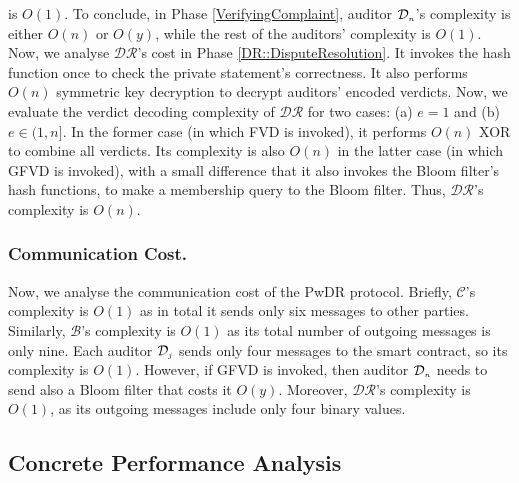 is $O(1)$. To conclude, in Phase \ref{VerifyingComplaint},  auditor $\mathcal{D}_{\scriptscriptstyle n}$'s complexity is either $O(n)$ or $O(y)$, while the rest of  the auditors' complexity is $O(1)$. Now, we analyse $\mathcal{DR}$'s cost in Phase \ref{DR::DisputeResolution}. It invokes the hash function once to check the private statement's correctness. It also performs $O(n)$ symmetric key decryption to decrypt auditors' encoded verdicts. Now, we evaluate the verdict decoding complexity of $\mathcal{DR}$ 
for two cases: (a) $e = 1$ and (b) $e \in (1, n]$. In the former case (in which  FVD is invoked), it performs $O(n)$ XOR to combine all verdicts. Its complexity is also $O(n)$ in the latter case (in which  GFVD is invoked), with a small difference that it also invokes the Bloom filter's hash functions, to make a membership query to the Bloom filter.  Thus, $\mathcal{DR}$'s complexity is $O(n)$. 

\vspace{-4mm}

\subsubsection{Communication Cost.} Now, we analyse the communication cost of the PwDR protocol. Briefly, $\mathcal{C}$'s complexity is $O(1)$ as in total it sends only six messages to other parties. Similarly, $\mathcal{B}$'s complexity is $O(1)$ as its total number of outgoing messages is only nine. Each auditor $\mathcal{D}_{\scriptscriptstyle j}$ sends only four messages to the smart contract, so its complexity is $O(1)$. However, if GFVD is invoked, then auditor $\mathcal{D}_{\scriptscriptstyle n}$ needs to send also a Bloom filter that costs it $O(y)$. Moreover, $\mathcal{DR}$'s complexity is $O(1)$, as its outgoing messages include  only four binary values. 

\vspace{-3mm}
\subsection{Concrete Performance Analysis}

